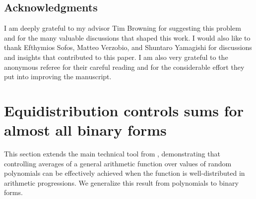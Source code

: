 \documentclass[reqno, 11pt]{amsart}
\renewcommand{\leq}{\leqslant}
\renewcommand{\geq}{\geqslant}
\newtheorem{theorem}{Theorem}[section]
\newtheorem{corollary}[theorem]{Corollary}
\theoremstyle{definition}
\theoremstyle{definition}
\renewcommand{\geq}{\geqslant}
\renewcommand{\leq}{\leqslant}
\newcommand{\cc}{\mathbf{c}}
\newcommand{\xx}{\mathbf{x}}
\newcommand{\QQ}{\mathbb{Q}}
\newcommand{\NNN}{\mathbf{N}}
\numberwithin{equation}{section}
\begin{document}


\subsection*{Acknowledgments}

I am deeply grateful to my advisor Tim Browning for suggesting this problem and for the many valuable discussions that shaped this work. I would also like to thank Efthymios Sofos, Matteo Verzobio, and Shuntaro Yamagishi for discussions and insights that contributed to this paper. I am also very grateful to the anonymous referee for their careful reading and for the considerable effort they put into improving the manuscript.














\section{Equidistribution controls sums for almost all binary forms}

This section extends the main technical tool from \cite[Theorem 2.2]{BST}, demonstrating that controlling averages of a general arithmetic function over values of random polynomials can be effectively achieved when the function is well-distributed in arithmetic progressions. We generalize this result from polynomials to binary forms.
\end{document}
